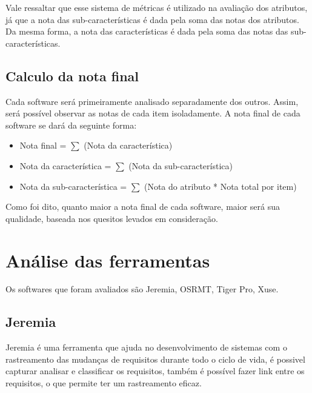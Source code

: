   Vale ressaltar que esse sistema de métricas é utilizado na avaliação dos atributos, já que a nota das sub-características é dada pela
  soma das notas dos atributos. Da mesma forma, a nota das características é dada pela soma das notas das sub-características.

\subsection{Calculo da nota final}

  Cada software será primeiramente analisado separadamente dos outros. Assim, será possível observar as notas de cada item isoladamente.
  A nota final de cada software se dará da seguinte forma:

  \begin{itemize}
    \item Nota final = $\displaystyle\sum$ (Nota da característica)
    \item Nota da característica = $\displaystyle\sum$ (Nota da sub-característica)
    \item Nota da sub-característica = $\displaystyle\sum$ (Nota do atributo * Nota total por item)
  \end{itemize}

  Como foi dito, quanto maior a nota final de cada software, maior será sua qualidade, baseada nos quesitos levados em consideração.

\section{Análise das ferramentas}

  Os softwares que foram avaliados são Jeremia, OSRMT, Tiger Pro, Xuse.

\subsection{Jeremia}

  Jeremia é uma ferramenta que ajuda no desenvolvimento de sistemas com o rastreamento das mudanças de requisitos durante todo o ciclo
  de vida, é possivel capturar analisar e classificar os requisitos, também é possível fazer link entre os requisitos, o que permite ter
  um rastreamento eficaz.

